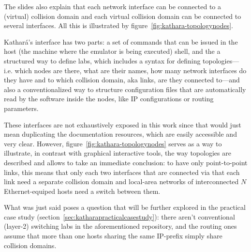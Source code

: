 The slides also explain that each network interface can be connected to a (virtual) collision domain and each virtual collision domain can be connected to several interfaces.
All this is illustrated by figure~\ref{fig:kathara-topologynodes}.

Kathará's interface has two parts: a set of commands that can be issued in the host (the machine where the emulator is being executed) shell, and the a structured way to define labs, which includes a syntax for defining topologies---i.e. which nodes are there, what are their names, how many network interfaces do they have and to which collision domain, aka links, are they connected to---and also a conventionalized way to structure configuration files that are automatically read by the software inside the nodes, like IP configurations or routing parameters.

These interfaces are not exhaustively exposed in this work since that would just mean duplicating the documentation resources, which are easily accessible and very clear.
However, figure~\ref{fig:kathara-topologynodes} serves as a way to illustrate, in contrast with graphical interactive tools, the way topologies are described and allows to take an immediate conclusion: to have only point-to-point links, this means that only each two interfaces that are connected via that each link need a separate collision domain and local-area networks of interconnected $N$ Ethernet-equiped hosts need a switch between them.

What was just said poses a question that will be further explored in the practical case study (section~\ref{sec:katharapracticalcasestudy}): there aren't conventional (layer-2) switching labs in the aforementioned repository, and the routing ones assume that more than one hosts sharing the same IP-prefix simply share collision domains.



